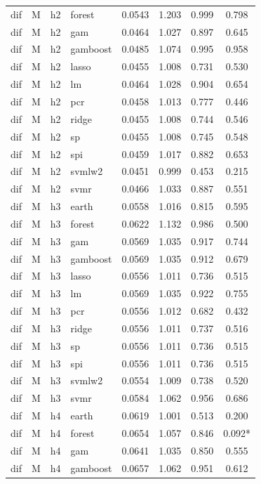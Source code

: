 \begin{ThreePartTable}
\begin{longtable}[t]{llclcccc}
dif & M & h2 & forest & 0.0543 & 1.203 & 0.999 & 0.798\\
dif & M & h2 & gam & 0.0464 & 1.027 & 0.897 & 0.645\\
dif & M & h2 & gamboost & 0.0485 & 1.074 & 0.995 & 0.958\\
dif & M & h2 & lasso & 0.0455 & 1.008 & 0.731 & 0.530\\
dif & M & h2 & lm & 0.0464 & 1.028 & 0.904 & 0.654\\
dif & M & h2 & pcr & 0.0458 & 1.013 & 0.777 & 0.446\\
dif & M & h2 & ridge & 0.0455 & 1.008 & 0.744 & 0.546\\
dif & M & h2 & sp & 0.0455 & 1.008 & 0.745 & 0.548\\
dif & M & h2 & spi & 0.0459 & 1.017 & 0.882 & 0.653\\
dif & M & h2 & svmlw2 & 0.0451 & 0.999 & 0.453 & 0.215\\
dif & M & h2 & svmr & 0.0466 & 1.033 & 0.887 & 0.551\\
\addlinespace
dif & M & h3 & earth & 0.0558 & 1.016 & 0.815 & 0.595\\
dif & M & h3 & forest & 0.0622 & 1.132 & 0.986 & 0.500\\
dif & M & h3 & gam & 0.0569 & 1.035 & 0.917 & 0.744\\
dif & M & h3 & gamboost & 0.0569 & 1.035 & 0.912 & 0.679\\
dif & M & h3 & lasso & 0.0556 & 1.011 & 0.736 & 0.515\\
dif & M & h3 & lm & 0.0569 & 1.035 & 0.922 & 0.755\\
dif & M & h3 & pcr & 0.0556 & 1.012 & 0.682 & 0.432\\
dif & M & h3 & ridge & 0.0556 & 1.011 & 0.737 & 0.516\\
dif & M & h3 & sp & 0.0556 & 1.011 & 0.736 & 0.515\\
dif & M & h3 & spi & 0.0556 & 1.011 & 0.736 & 0.515\\
dif & M & h3 & svmlw2 & 0.0554 & 1.009 & 0.738 & 0.520\\
dif & M & h3 & svmr & 0.0584 & 1.062 & 0.956 & 0.686\\
\addlinespace
dif & M & h4 & earth & 0.0619 & 1.001 & 0.513 & 0.200\\
dif & M & h4 & forest & 0.0654 & 1.057 & 0.846 & 0.092*\\
dif & M & h4 & gam & 0.0641 & 1.035 & 0.850 & 0.555\\
dif & M & h4 & gamboost & 0.0657 & 1.062 & 0.951 & 0.612\\

\end{longtable}
\end{ThreePartTable}
